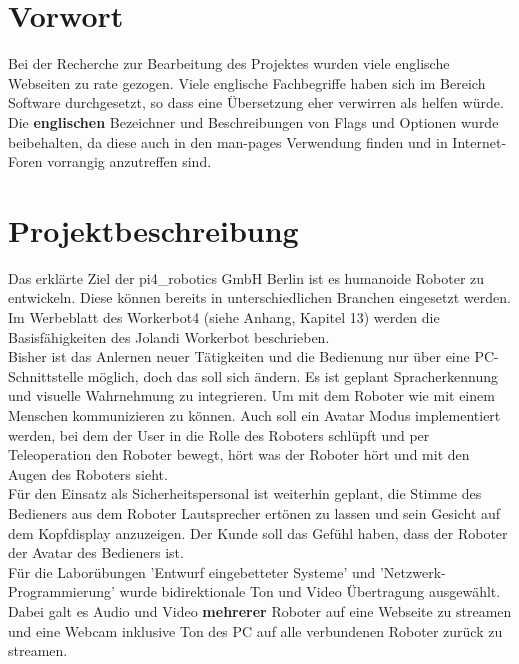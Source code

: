 \section{Vorwort}
Bei der Recherche zur Bearbeitung des Projektes wurden viele englische Webseiten zu rate gezogen. Viele englische Fachbegriffe haben sich im Bereich Software durchgesetzt, so dass 
eine Übersetzung eher verwirren als helfen würde. Die \textbf{englischen} Bezeichner und Beschreibungen von Flags und Optionen wurde beibehalten, da diese auch in den man-pages Verwendung finden und in Internet-Foren vorrangig anzutreffen sind.

\section{Projektbeschreibung}
Das erklärte Ziel der pi4\_robotics GmbH Berlin ist es humanoide Roboter zu entwickeln. 
Diese können bereits in unterschiedlichen Branchen eingesetzt werden. Im Werbeblatt 
des Workerbot4 (siehe Anhang, Kapitel 13) werden die Basisfähigkeiten des Jolandi Workerbot beschrieben.  \\
Bisher ist das Anlernen neuer Tätigkeiten und die Bedienung nur über eine PC-Schnittstelle möglich, doch das soll sich ändern. Es ist geplant Spracherkennung und visuelle Wahrnehmung 
zu integrieren. Um mit dem Roboter wie mit einem Menschen kommunizieren zu können. Auch soll 
ein Avatar Modus implementiert werden, bei dem der User in die Rolle des Roboters schlüpft 
und per Teleoperation den Roboter bewegt, hört was der Roboter hört und mit den Augen des Roboters sieht. \\
Für den Einsatz als Sicherheitspersonal ist weiterhin geplant, die Stimme des Bedieners aus dem Roboter Lautsprecher ertönen zu lassen und sein Gesicht auf dem Kopfdisplay anzuzeigen. 
Der Kunde soll das Gefühl haben, dass der Roboter der Avatar des Bedieners ist.\\
Für die Laborübungen 'Entwurf eingebetteter Systeme' und 'Netzwerk-Programmierung' wurde 
bidirektionale Ton und Video Übertragung ausgewählt. Dabei galt es Audio und Video 
\textbf{mehrerer} Roboter auf eine Webseite zu streamen und eine Webcam inklusive Ton des PC 
auf alle verbundenen Roboter zurück zu streamen.\\
